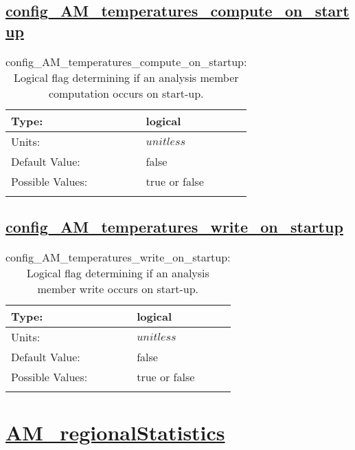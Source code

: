 \subsection[config\_AM\_temperatures\_compute\_on\_startup]{\hyperref[sec:nm_tab_AM_temperatures]{config\_AM\_temperatures\_compute\_on\_startup}}
\label{subsec:nm_sec_config_AM_temperatures_compute_on_startup}
\begin{center}
\begin{longtable}{| p{2.0in} || p{4.0in} |}
    \hline
    Type: & logical \\
    \hline
    Units: & $unitless$ \\
    \hline
    Default Value: & false \\
    \hline
    Possible Values: & true or false \\
    \hline
    \caption{config\_AM\_temperatures\_compute\_on\_startup: Logical flag determining if an analysis member computation occurs on start-up.}
\end{longtable}
\end{center}
\subsection[config\_AM\_temperatures\_write\_on\_startup]{\hyperref[sec:nm_tab_AM_temperatures]{config\_AM\_temperatures\_write\_on\_startup}}
\label{subsec:nm_sec_config_AM_temperatures_write_on_startup}
\begin{center}
\begin{longtable}{| p{2.0in} || p{4.0in} |}
    \hline
    Type: & logical \\
    \hline
    Units: & $unitless$ \\
    \hline
    Default Value: & false \\
    \hline
    Possible Values: & true or false \\
    \hline
    \caption{config\_AM\_temperatures\_write\_on\_startup: Logical flag determining if an analysis member write occurs on start-up.}
\end{longtable}
\end{center}
\section[AM\_regionalStatistics]{\hyperref[sec:nm_tab_AM_regionalStatistics]{AM\_regionalStatistics}}
\label{sec:nm_sec_AM_regionalStatistics}
